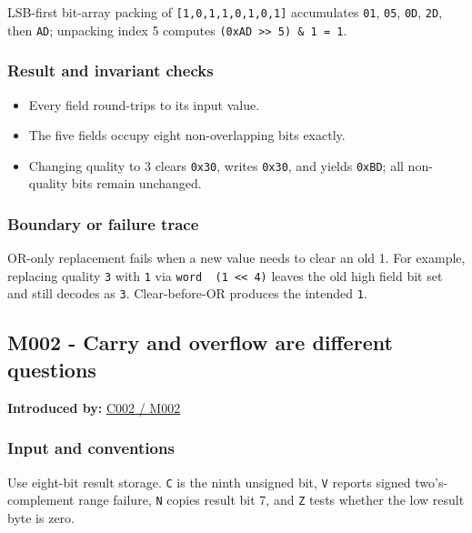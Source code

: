 LSB-first bit-array packing of \texttt{{[}1,0,1,1,0,1,0,1{]}} accumulates \texttt{01}, \texttt{05}, \texttt{0D}, \texttt{2D}, then \texttt{AD}; unpacking index 5 computes \texttt{(0xAD\ \textgreater{}\textgreater{}\ 5)\ \&\ 1\ =\ 1}.

\subsubsection{Result and invariant checks}\label{appendix-92ff77d4dfdc-result-and-invariant-checks}

\begin{itemize}
\tightlist
\item
  Every field round-trips to its input value.
\item
  The five fields occupy eight non-overlapping bits exactly.
\item
  Changing quality to 3 clears \texttt{0x30}, writes \texttt{0x30}, and yields \texttt{0xBD}; all non-quality bits remain unchanged.
\end{itemize}

\subsubsection{Boundary or failure trace}\label{appendix-92ff77d4dfdc-boundary-or-failure-trace}

OR-only replacement fails when a new value needs to clear an old 1. For example, replacing quality \texttt{3} with \texttt{1} via \texttt{word\ \textbar{}\ (1\ \textless{}\textless{}\ 4)} leaves the old high field bit set and still decodes as \texttt{3}. Clear-before-OR produces the intended \texttt{1}.

\subsection{M002 - Carry and overflow are different questions}\label{appendix-92ff77d4dfdc-m002---carry-and-overflow-are-different-questions}

\textbf{Introduced by:} \hyperref[01-foundations-i-ch001-arithmetic-becomes-a-policy]{C002 / M002}

\subsubsection{Input and conventions}\label{appendix-92ff77d4dfdc-input-and-conventions-1}

Use eight-bit result storage. \texttt{C} is the ninth unsigned bit, \texttt{V} reports signed two's-complement range failure, \texttt{N} copies result bit 7, and \texttt{Z} tests whether the low result byte is zero.

